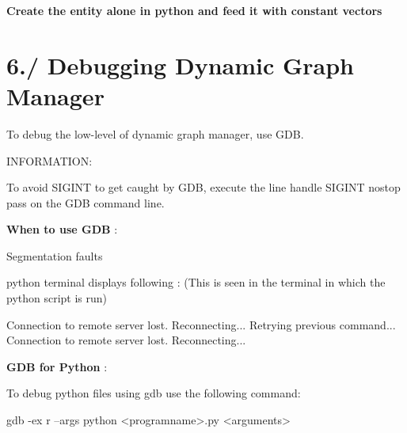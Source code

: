 \begin{DoxyEnumerate}
\begin{DoxyEnumerate}
\end{DoxyEnumerate}
\item {\bfseries  Create the entity alone in python and feed it with constant vectors }
\end{DoxyEnumerate}\hypertarget{subpage_debugging_debug_sec_dgm}{}\section{6./ Debugging Dynamic Graph Manager}\label{subpage_debugging_debug_sec_dgm}
To debug the low-\/level of dynamic graph manager, use G\+DB. 
\begin{DoxyCode}
INFORMATION:

To avoid SIGINT to \textcolor{keyword}{get} caught by GDB, execute the line handle SIGINT nostop pass on the GDB command line.
\end{DoxyCode}


{\bfseries  When to use G\+DB } \+:
\begin{DoxyEnumerate}
\item Segmentation faults
\item python terminal displays following \+: (This is seen in the terminal in which the python script is run) 
\begin{DoxyCode}
Connection to remote server lost. Reconnecting...
Retrying previous command...
Connection to remote server lost. Reconnecting...
\end{DoxyCode}

\end{DoxyEnumerate}

{\bfseries  G\+DB for Python }\+:

To debug python files using gdb use the following command\+: 
\begin{DoxyCode}
gdb -ex r --args python <programname>.py <arguments>
\end{DoxyCode}
 